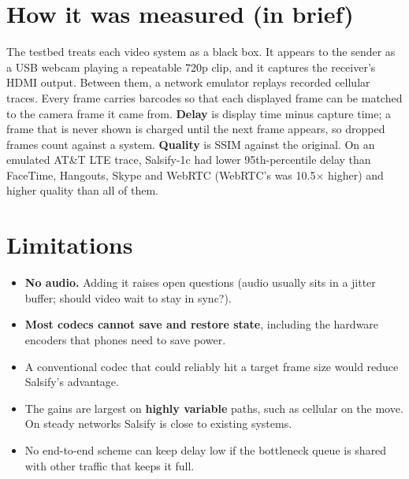 \section{How it was measured (in brief)}
The testbed treats each video system as a black box. It appears to the sender as a USB webcam playing a repeatable 720p clip, and it captures the receiver's
HDMI output. Between them, a network emulator replays recorded cellular traces. Every frame carries barcodes so that each displayed frame can be matched to the
camera frame it came from. \textbf{Delay} is display time minus capture time; a frame that is never shown is charged until the next frame appears, so dropped
frames count against a system. \textbf{Quality} is SSIM against the original. On an emulated AT\&T LTE trace, Salsify-1c had lower 95th-percentile delay than
FaceTime, Hangouts, Skype and WebRTC (WebRTC's was 10.5$\times$ higher) and higher quality than all of them.

\section{Limitations}
\begin{itemize}
  \item \textbf{No audio.} Adding it raises open questions (audio usually sits in a jitter buffer; should video wait to stay in sync?).
  \item \textbf{Most codecs cannot save and restore state}, including the hardware encoders that phones need to save power.
  \item A conventional codec that could reliably hit a target frame size would reduce Salsify's advantage.
  \item The gains are largest on \textbf{highly variable} paths, such as cellular on the move. On steady networks Salsify is close to existing systems.
  \item No end-to-end scheme can keep delay low if the bottleneck queue is shared with other traffic that keeps it full.
\end{itemize}

